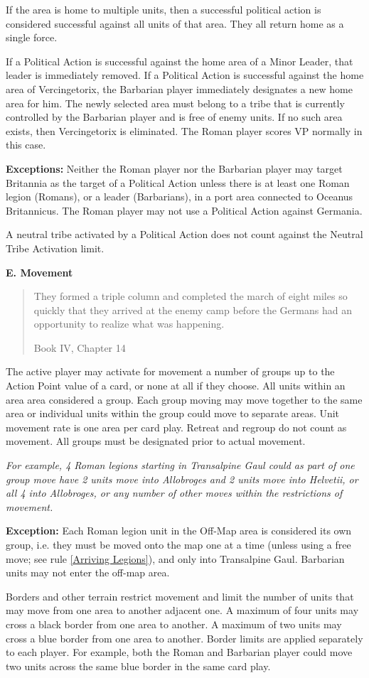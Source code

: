 If the area is home to multiple units, then a successful political action is considered successful against all units of that area. They all return home as a single force.

If a Political Action is successful against the home area of a Minor Leader, that leader is immediately removed. If a Political Action is successful  against the home area of Vercingetorix, the Barbarian player immediately designates a new home area for him. The newly selected area must belong to a tribe that is currently controlled by the Barbarian player and is free of enemy units. If no such area exists, then Vercingetorix is eliminated. The Roman player scores VP normally in this case.

\textbf{Exceptions:} Neither the Roman player nor the Barbarian player may target Britannia as the target of a Political Action unless there is at least one Roman legion (Romans), or a leader (Barbarians), in a port area connected to Oceanus Britannicus. The Roman player may not use a Political Action against Germania.

A neutral tribe activated by a Political Action does not count against the Neutral Tribe Activation limit.

\textbf{E. Movement}
\blockquote[Book IV, Chapter 14]{They formed a triple column and completed the march of eight miles so quickly that they arrived at the enemy camp before the Germans had an opportunity to realize what was happening.}
\par
The active player may activate for movement a number of groups up to the Action Point value of a card, or none at all if they choose. All units within an area area considered a group. Each group moving may move together to the same area or individual units within the group could move to separate areas. Unit movement rate is one area per card play. Retreat and regroup do not count as movement. All groups must be designated prior to actual movement.

\textit{For example, 4 Roman legions starting in Transalpine Gaul could as part of one group move have 2 units move into Allobroges and 2 units move into Helvetii, or all 4 into Allobroges, or any number of other moves within the restrictions of movement.}

\textbf{Exception:} Each Roman legion unit in the Off-Map area is considered its own group, i.e. they must be moved onto the map one at a time (unless using a free move; see rule \ref{Arriving Legions}), and only into Transalpine Gaul. Barbarian units may not enter the off-map area.
\par
Borders and other terrain restrict movement and limit the number of units that may move from one area to another adjacent one. A maximum of four units may cross a black border from one area to another. A maximum of two units may cross a blue border from one area to another. Border limits are applied separately to each player. For example, both the Roman and Barbarian player could move two units across the same blue border in the same card play.

